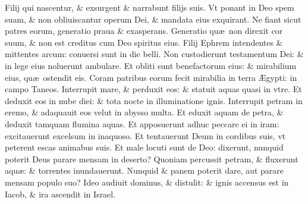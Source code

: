 \documentclass[a5paper,10pt]{book}
\def\ae{æ}
\def\AE{Æ}
\begin{document}
\begin{multicols*}{2}
\newline \color{red} F\color{black}ilij qui nascentur, \& exsurgent \& narrabunt filijs suis.
\newline \color{red} V\color{black}t ponant in Deo spem suam, \& non obliuiscantur operum Dei, \& mandata eius exquirant.
\newline \color{red} N\color{black}e fiant sicut patres eorum, generatio praua \& exasperans.
\newline \color{red} G\color{black}eneratio qu\ae \ non direxit cor suum, \& non est creditus cum Deo spiritus eius.
\newline \color{red} F\color{black}ilij Ephrem intendentes \& mittentes arcum: conuersi sunt in die belli.
\newline \color{red} N\color{black}on custodierunt testamentum Dei: \& in lege eius noluerunt ambulare.
\newline \color{red} E\color{black}t obliti sunt benefactorum eius: \& mirabilium eius, qu\ae \ ostendit eis.
\newline \color{red} C\color{black}oram patribus eorum fecit mirabilia in terra \AE gypti: in campo Taneos.
\newline \color{red} I\color{black}nterrupit mare, \& perduxit eos: \& statuit aquas quasi in vtre.
\newline \color{red} E\color{black}t deduxit eos in nube diei: \& tota nocte in illuminatione ignis.
\newline \color{red} I\color{black}nterrupit petram in eremo, \& adaquauit eos velut in abysso multa.
\newline \color{red} E\color{black}t eduxit aquam de petra, \& deduxit tamquam flumina aquas.
\newline \color{red} E\color{black}t apposuerunt adhuc peccare ei in iram: excitauerunt excelsum in inaquoso.
\newline \color{red} E\color{black}t tentauerunt Deum in cordibus suis, vt peterent escas animabus suis.
\newline \color{red} E\color{black}t male locuti sunt de Deo: dixerunt, nunquid poterit Deus parare mensam in deserto?
\newline \color{red} Q\color{black}uoniam percussit petram, \& fluxerunt aqu\ae : \& torrentes inundauerunt.
\newline \color{red} N\color{black}unquid \& panem poterit dare, aut parare mensam populo suo?
\newline \color{red} I\color{black}deo audiuit dominus, \& distulit: \& ignis accensus est in Iacob, \& ira ascendit in Israel.

\end{multicols*}
\end{document}
